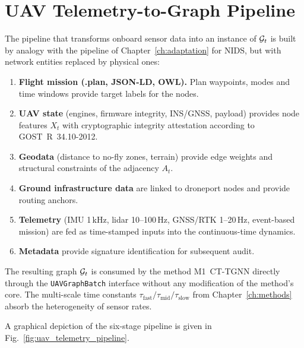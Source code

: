 \section{UAV Telemetry-to-Graph Pipeline}
\label{sec:uav_pipeline}

The pipeline that transforms onboard sensor data into an instance of
$\mathcal{G}_t$ is built by analogy with the pipeline of
Chapter~\ref{ch:adaptation} for NIDS, but with network entities
replaced by physical ones:

\begin{enumerate}\setlength\itemsep{0.15em}
\item \textbf{Flight mission (.plan, JSON-LD, OWL).} Plan waypoints,
modes and time windows provide target labels for the nodes.
\item \textbf{UAV state} (engines, firmware integrity, INS/GNSS,
payload) provides node features $X_t$ with cryptographic integrity
attestation according to \mbox{GOST~R~34.10-2012}.
\item \textbf{Geodata} (distance to no-fly zones, terrain) provide
edge weights and structural constraints of the adjacency $A_t$.
\item \textbf{Ground infrastructure data} are linked to droneport
nodes and provide routing anchors.
\item \textbf{Telemetry} (IMU 1\,kHz, lidar 10--100\,Hz, GNSS/RTK
1--20\,Hz, event-based mission) are fed as time-stamped inputs into
the continuous-time dynamics.
\item \textbf{Metadata} provide signature identification for
subsequent audit.
\end{enumerate}

The resulting graph $\mathcal{G}_t$ is consumed by the method
\textsf{M1~CT-TGNN} directly through the \texttt{UAVGraphBatch}
interface without any modification of the method's core. The
multi-scale time constants
$\tau_{\mathrm{fast}}/\tau_{\mathrm{mid}}/\tau_{\mathrm{slow}}$ from
Chapter~\ref{ch:methods} absorb the heterogeneity of sensor rates.

A graphical depiction of the six-stage pipeline is given in
Fig.~\ref{fig:uav_telemetry_pipeline}.

